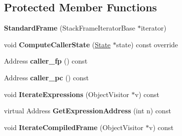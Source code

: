 \subsection*{Protected Member Functions}
\begin{DoxyCompactItemize}
\item 
{\bfseries Standard\+Frame} (Stack\+Frame\+Iterator\+Base $\ast$iterator)\hypertarget{classv8_1_1internal_1_1_standard_frame_a3d2800d598b2aa9e6c10762caef1399c}{}\label{classv8_1_1internal_1_1_standard_frame_a3d2800d598b2aa9e6c10762caef1399c}

\item 
void {\bfseries Compute\+Caller\+State} (\hyperlink{classv8_1_1internal_1_1_state}{State} $\ast$state) const  override\hypertarget{classv8_1_1internal_1_1_standard_frame_a82e6d1ca974ddf3a15631af057f49c3c}{}\label{classv8_1_1internal_1_1_standard_frame_a82e6d1ca974ddf3a15631af057f49c3c}

\item 
Address {\bfseries caller\+\_\+fp} () const \hypertarget{classv8_1_1internal_1_1_standard_frame_a85d027e8d2d3f59a4344e054cb271bef}{}\label{classv8_1_1internal_1_1_standard_frame_a85d027e8d2d3f59a4344e054cb271bef}

\item 
Address {\bfseries caller\+\_\+pc} () const \hypertarget{classv8_1_1internal_1_1_standard_frame_a46147d914bd21ce0e5cb469f7bed8263}{}\label{classv8_1_1internal_1_1_standard_frame_a46147d914bd21ce0e5cb469f7bed8263}

\item 
void {\bfseries Iterate\+Expressions} (Object\+Visitor $\ast$v) const \hypertarget{classv8_1_1internal_1_1_standard_frame_ae9d20f0dbf4fafe202fd61a65103d20a}{}\label{classv8_1_1internal_1_1_standard_frame_ae9d20f0dbf4fafe202fd61a65103d20a}

\item 
virtual Address {\bfseries Get\+Expression\+Address} (int n) const \hypertarget{classv8_1_1internal_1_1_standard_frame_a25981494e516fce96e3638c0e1ae016b}{}\label{classv8_1_1internal_1_1_standard_frame_a25981494e516fce96e3638c0e1ae016b}

\item 
void {\bfseries Iterate\+Compiled\+Frame} (Object\+Visitor $\ast$v) const \hypertarget{classv8_1_1internal_1_1_standard_frame_a84c2ea0cdd334959a56e896ed021e9ac}{}\label{classv8_1_1internal_1_1_standard_frame_a84c2ea0cdd334959a56e896ed021e9ac}

\end{DoxyCompactItemize}
